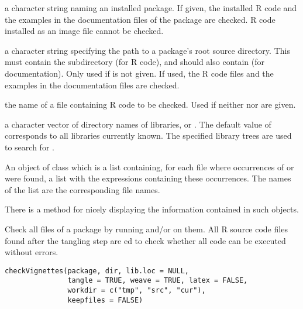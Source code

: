 \begin{Arguments}
\begin{ldescription}
\item[\code{package}] a character string naming an installed package.  If
given, the installed R code and the examples in the documentation
files of the package are checked.  R code installed as an image file
cannot be checked.
\item[\code{dir}] a character string specifying the path to a package's root
source directory.  This must contain the subdirectory  (for
R code), and should also contain  (for documentation).
Only used if  is not given.  If used, the R code files
and the examples in the documentation files are checked.
\item[\code{file}] the name of a file containing R code to be checked.  Used
if neither  nor  are given.
\item[\code{lib.loc}] a character vector of directory names of \R{} libraries,
or .  The default value of  corresponds to all
libraries currently known.  The specified library trees are used to
search for .
\end{ldescription}
\end{Arguments}
%
\begin{Value}
An object of class  which is a list containing, for
each file where occurrences of  or  were found, a list
with the expressions containing these occurrences.  The names of the
list are the corresponding file names.

There is a  method for nicely displaying the information
contained in such objects.
\end{Value}
%
\begin{Description}\relax
Check all  files of a package by running
 and/or  on them. All
R source code files found after the tangling step are
ed to check whether all code can be
executed without errors.
\end{Description}
%
\begin{Usage}
\begin{verbatim}
checkVignettes(package, dir, lib.loc = NULL,
               tangle = TRUE, weave = TRUE, latex = FALSE,
               workdir = c("tmp", "src", "cur"),
               keepfiles = FALSE)
\end{verbatim}
\end{Usage}

